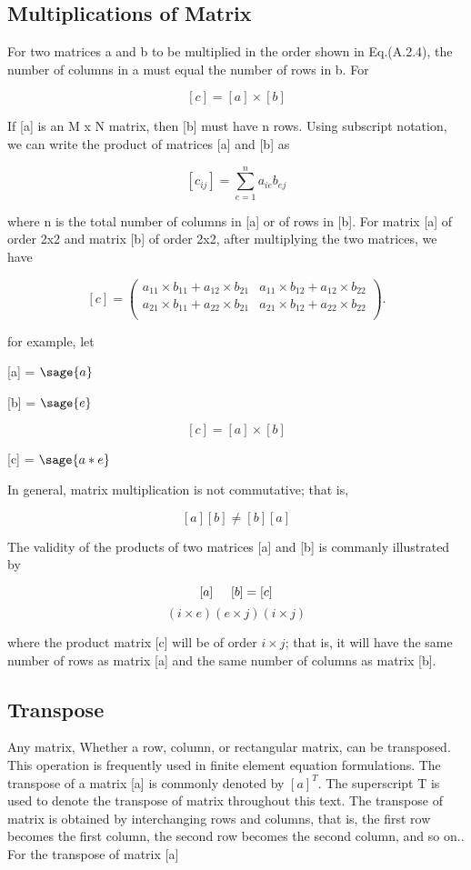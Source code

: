 \documentclass[12pt]{report}
\begin{document}
\subsection{Multiplications of Matrix}
For two matrices a and b to be multiplied in the order shown in Eq.(A.2.4), the number of columns in a must equal the number of rows in b. For

\[[c] = [a] \times [b]\]

If [a] is an M x N matrix, then [b] must have n
rows. Using subscript notation, we can write the product of matrices
[a] and [b] as

\[[c_{{ij}}] = \sum_{e=1}^{n} {a_{ie}}{b_{ej}}\]

where n is the total number of columns in [a] or of rows in
[b]. For matrix [a] of order 2x2 and matrix
[b] of order 2x2, after multiplying the two matrices, we
have

\[[c]=\left(\begin{array}{rrrrrr}
a_{11} \times b_{11} + a_{12} \times b_{21} & a_{11} \times b_{12} + a_{12} \times b_{22}\\
a_{21} \times b_{11} + a_{22} \times b_{21} & a_{21} \times b_{12} + a_{22} \times b_{22}\\
\end{array}\right).\]

for example, let 

\begin{center}
[a] = $\sage{a}$

[b] = $\sage{e}$


\[[c] = [a] \times [b]\]


[c] = $\sage{a*e}$
\end{center}

In general, matrix multiplication is not commutative; that is,

\[ [a][b] \neq [b][a] \]

The validity of the products of two matrices [a] and
[b] is commanly illustrated by

\[ [a] \hspace{0.5cm} [b] = [c] \]
\[ (i \times e)(e \times j) (i \times j) \]

where the product matrix [c] will be of order $i \times j$;
that is, it will have the same number of rows as matrix [a]
and the same number of columns as matrix [b].

\subsection{Transpose}
Any matrix, Whether a row, column, or rectangular matrix, can be
transposed. This operation is frequently used in finite element
equation formulations. The transpose of a matrix [a] is
commonly denoted by $[a]^T$. The superscript T is used to
denote the transpose of matrix throughout this text. The transpose of
matrix is obtained by interchanging rows and columns, that is, the
first row becomes the first column, the second row becomes the second
column, and so on.. For the transpose of matrix [a]
\end{document}
